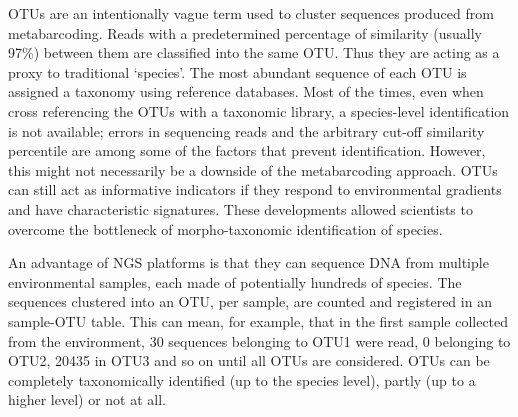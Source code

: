 OTUs are an intentionally vague term used to cluster sequences produced from  metabarcoding. Reads with a predetermined percentage of similarity (usually 97\%) between them are classified into the same OTU. Thus they are acting as a proxy to traditional `species'. The most abundant sequence of each OTU is assigned a taxonomy using reference databases. Most of the times, even when cross referencing the OTUs with a taxonomic library, a species-level identification is not available; errors in sequencing reads and the arbitrary cut-off similarity percentile are among some of the factors that prevent identification. However, this might not necessarily be a downside of the metabarcoding approach. OTUs can still act as informative indicators if they respond to environmental gradients and have characteristic signatures. 
These developments allowed scientists to overcome the bottleneck of morpho-taxonomic identification of species. 


An advantage of NGS platforms is that they can sequence DNA from multiple environmental samples, each made of potentially hundreds of species. The sequences clustered into an OTU, per sample, are counted and registered in an sample-OTU table. This can mean, for example, that in the first sample collected from the environment, 30 sequences belonging to OTU1 were read, 0 belonging to OTU2, 20435 in OTU3 and so on until all OTUs are considered. OTUs can be completely taxonomically identified (up to the species level), partly (up to a higher level) or not at all. 




